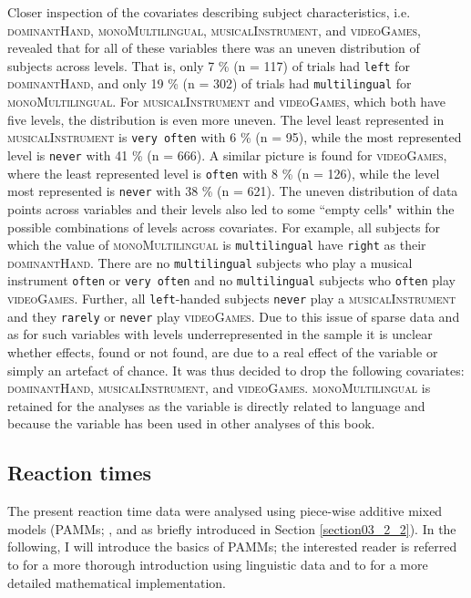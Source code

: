 Closer inspection of the covariates describing subject characteristics, i.e. \textsc{dominantHand}, \textsc{monoMultilingual}, \textsc{musicalInstrument}, and \textsc{videoGames}, revealed that for all of these variables there was an uneven distribution of subjects across levels. That is, only 7 \% (n = 117) of trials had \texttt{left} for \textsc{dominantHand}, and only 19 \% (n = 302) of trials had \texttt{multilingual} for \textsc{monoMultilingual}. For \textsc{musicalInstrument} and \textsc{videoGames}, which both have five levels, the distribution is even more uneven. The level least represented in \textsc{musicalInstrument} is \texttt{very often} with 6 \% (n = 95), while the most represented level is \texttt{never} with 41 \% (n = 666). A similar picture is found for \textsc{videoGames}, where the least represented level is \texttt{often} with 8 \% (n = 126), while the level most represented is \texttt{never} with 38 \% (n = 621). The uneven distribution of data points across variables and their levels also led to some ``empty cells" within the possible combinations of levels across covariates. For example, all subjects for which the value of \textsc{monoMultilingual} is \texttt{multilingual} have \texttt{right} as their \textsc{dominantHand}. There are no \texttt{multilingual} subjects who play a musical instrument \texttt{often} or \texttt{very often} and no \texttt{multilingual} subjects who \texttt{often} play \textsc{videoGames}. Further, all \texttt{left}-handed subjects \texttt{never} play a \textsc{musicalInstrument} and they \texttt{rarely} or \texttt{never} play \textsc{videoGames}. Due to this issue of sparse data and as for such variables with levels underrepresented in the sample it is unclear whether effects, found or not found, are due to a real effect of the variable or simply an artefact of chance. It was thus decided to drop the following covariates: \textsc{dominantHand}, \textsc{musicalInstrument}, and \textsc{videoGames}. \textsc{monoMultilingual} is retained for the analyses as the variable is directly related to language and because the variable has been used in other analyses of this book.

\subsection{Reaction times}\label{section07_2_2}

The present reaction time data were analysed using piece-wise additive mixed models (PAMMs; \cite{Bender2018etal}, and as briefly introduced in Section \ref{section03_2_2}). In the following, I will introduce the basics of PAMMs; the interested reader is referred to \citet{Hendrix2020} for a more thorough introduction using linguistic data and to \citet{Bender2018etal} for a more detailed mathematical implementation. 

